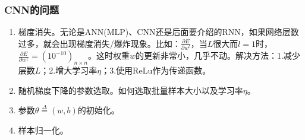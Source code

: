         \subsubsection{CNN的问题}
            \par
            \begin{enumerate}
            \item 梯度消失。无论是ANN(MLP)、CNN还是后面要介绍的RNN，如果网络层数过多，就会出现梯度消失/爆炸现象。比如：$\frac{\partial E}{\partial w^l}$，当$L$很大而$l =1$时，$\frac{\partial E}{\partial w^1} = (10^{-10})_{n\times n}$。这时权重$w$的更新非常小，几乎不动。解决方法：1.减少层数$L$；2.增大学习率$\eta$；3.使用ReLu作为传递函数。
            \item 随机梯度下降的参数选取。如何选取批量样本大小以及学习率$\eta$。
            \item 参数$\theta \overset{\Delta }{=}(w,b)$的初始化。
            \item 样本归一化。
            \end{enumerate}

